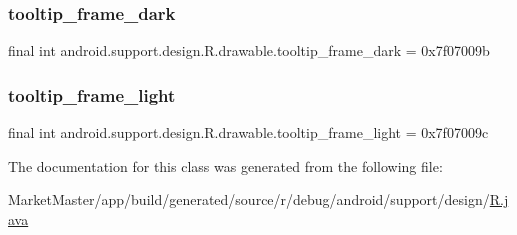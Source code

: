 \subsubsection{\texorpdfstring{tooltip\+\_\+frame\+\_\+dark}{tooltip\_frame\_dark}}
{\footnotesize\ttfamily final int android.\+support.\+design.\+R.\+drawable.\+tooltip\+\_\+frame\+\_\+dark = 0x7f07009b\hspace{0.3cm}{\ttfamily [static]}}

\mbox{\label{classandroid_1_1support_1_1design_1_1R_1_1drawable_aafa93bfc1b95635189723fd95253b79c}} 
\subsubsection{\texorpdfstring{tooltip\+\_\+frame\+\_\+light}{tooltip\_frame\_light}}
{\footnotesize\ttfamily final int android.\+support.\+design.\+R.\+drawable.\+tooltip\+\_\+frame\+\_\+light = 0x7f07009c\hspace{0.3cm}{\ttfamily [static]}}



The documentation for this class was generated from the following file\+:\begin{DoxyCompactItemize}
\item 
Market\+Master/app/build/generated/source/r/debug/android/support/design/\mbox{\hyperlink{debug_2android_2support_2design_2R_8java}{R.\+java}}\end{DoxyCompactItemize}
